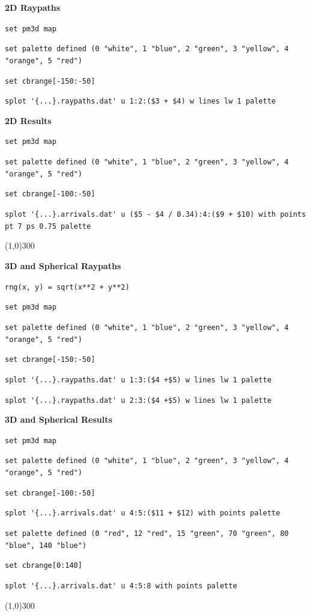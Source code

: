 \documentclass[10pt]{article}
\begin{document}
\begin{footnotesize}

\hspace{-0.25in}\textbf{2D Raypaths}

\verb=set pm3d map=

\verb=set palette defined (0 "white", 1 "blue", 2 "green", 3 "yellow", 4 "orange", 5 "red")=

\verb=set cbrange[-150:-50]=

\verb#splot '{...}.raypaths.dat' u 1:2:($3 + $4) w lines lw 1 palette#

\vspace{0.015\textheight}
\hspace{-0.25in}\textbf{2D Results}

\verb=set pm3d map=

\verb=set palette defined (0 "white", 1 "blue", 2 "green", 3 "yellow", 4 "orange", 5 "red")=

\verb=set cbrange[-100:-50]=

\verb=splot '{...}.arrivals.dat' u ($5 - $4 / 0.34):4:($9 + $10) with points pt 7 ps 0.75 palette= \newline

\vspace*{-5pt}
\begin{center}\line(1,0){300}\end{center}

\hspace{-0.25in}\textbf{3D and Spherical  Raypaths}

\verb#rng(x, y) = sqrt(x**2 + y**2)#

\verb=set pm3d map=

\verb=set palette defined (0 "white", 1 "blue", 2 "green", 3 "yellow", 4 "orange", 5 "red")=

\verb=set cbrange[-150:-50]=

\verb#splot '{...}.raypaths.dat' u 1:3:($4 +$5) w lines lw 1 palette#

\verb#splot '{...}.raypaths.dat' u 2:3:($4 +$5) w lines lw 1 palette#

\vspace{0.015\textheight}
\hspace{-0.25in}\textbf{3D and Spherical Results}

\verb=set pm3d map=

\verb=set palette defined (0 "white", 1 "blue", 2 "green", 3 "yellow", 4 "orange", 5 "red")=

\verb=set cbrange[-100:-50]=

\verb=splot '{...}.arrivals.dat' u 4:5:($11 + $12) with points palette= 

\verb=set palette defined (0 "red", 12 "red", 15 "green", 70 "green", 80 "blue", 140 "blue")=

\verb=set cbrange[0:140]=

\verb=splot '{...}.arrivals.dat' u 4:5:8 with points palette=

\vspace*{-5pt}
\begin{center}\line(1,0){300}\end{center}
\end{footnotesize}
\end{document}
